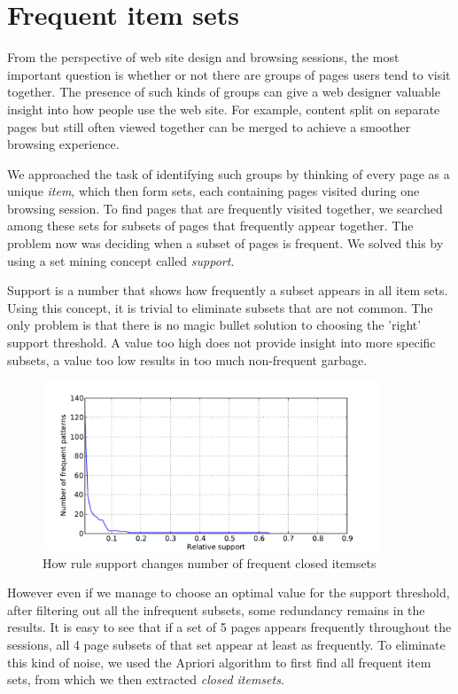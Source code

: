 \documentclass[12pt, english,a4paper]{article}
\begin{document}
\section{Frequent item sets} 
From the perspective of web site design and browsing sessions, the most important question is whether or not there are groups of pages users tend to visit together. The presence of such kinds of groups can give a web designer valuable insight into how people use the web site. For example, content split on separate pages but still often viewed together can be merged to achieve a smoother browsing experience.

We approached the task of identifying such groups by thinking of every page as a unique \emph{item}, which then form sets, each containing pages visited during one browsing session. To find pages that are frequently visited together, we searched among these sets for subsets of pages that frequently appear together. The problem now was deciding when a subset of pages is frequent. We solved this by using a set mining \cite{frequent_item_set_mining} concept called \emph{support}.

Support is a number that shows how frequently a subset appears in all item sets. Using this concept, it is trivial to eliminate subsets that are not common. The only problem is that there is no magic bullet solution to choosing the 'right' support threshold. A value too high does not provide insight into more specific subsets, a value too low results in too much non-frequent garbage.
\begin{figure}[H]
  \centering
      \includegraphics[width=0.9\textwidth]{apriori_closed_itemset_count}
  \caption{How rule support changes number of frequent closed itemsets}
\end{figure}


However even if we manage to choose an optimal value for the support threshold, after filtering out all the infrequent subsets, some redundancy remains in the results. It is easy to see that if a set of 5 pages appears frequently throughout the sessions, all 4 page subsets of that set appear at least as frequently. To eliminate this kind of noise, we used the Apriori algorithm \cite{apriori} to first find all frequent item sets, from which we then extracted \emph{closed itemsets}.
\end{document}
